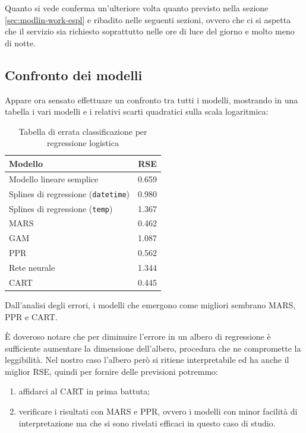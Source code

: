 Quanto si vede conferma un'ulteriore volta quanto previsto nella sezione
\ref{sec:modlin-work-espl} e ribadito nelle seguenti sezioni, ovvero che ci si
aspetta che il servizio sia richiesto soprattutto nelle ore di luce del
giorno e molto meno di notte.

\subsection{Confronto dei modelli}

Appare ora sensato effettuare un confronto tra tutti i modelli, mostrando in
una tabella i vari modelli e i relativi scarti quadratici sulla scala
logaritmica:

\begin{table}[H]
\begin{center}
\begin{tabular}{ | l | c }
  \hline
    Modello & RSE \\ \hline \hline
    Modello lineare semplice & 0.659 \\ \hline
    Splines di regressione (\texttt{datetime}) & 0.980 \\ \hline
    Splines di regressione (\texttt{temp}) & 1.367 \\ \hline
    MARS & 0.462 \\ \hline
    GAM & 1.087 \\ \hline
    PPR & 0.562 \\ \hline
    Rete neurale & 1.344 \\ \hline
    CART & 0.445 \\ \hline
\end{tabular}
  \caption{Tabella di errata classificazione per regressione logistica}
\end{center}
\end{table}

Dall'analisi degli errori, i modelli che emergono come migliori sembrano MARS,
PPR e CART.

È doveroso notare che per diminuire l'errore in un albero di regressione è
sufficiente aumentare la dimensione dell'albero, procedura che ne compromette
la leggibilità.
Nel nostro caso l'albero però si ritiene interpretabile ed ha anche il miglior
RSE, quindi per fornire delle previsioni potremmo:
\begin{enumerate}
\item affidarci al CART in prima battuta;
\item verificare i risultati con MARS e PPR, ovvero i modelli con minor
  facilità di interpretazione ma che si sono rivelati efficaci in questo caso
  di studio.
\end{enumerate}


